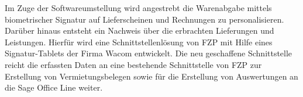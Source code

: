 Im Zuge der Softwareumstellung wird angestrebt die Warenabgabe mittels biometrischer Signatur auf Lieferscheinen und Rechnungen zu personalisieren. Darüber hinaus entsteht ein Nachweis über die erbrachten Lieferungen und Leistungen. Hierfür wird eine Schnittstellenlösung von FZP mit Hilfe eines Signatur-Tablets der Firma Wacom entwickelt. Die neu geschaffene Schnittstelle reicht die erfassten Daten an eine bestehende Schnittstelle von FZP zur Erstellung von Vermietungsbelegen sowie für die Erstellung von Auswertungen an die Sage Office Line weiter. \cite{einleitung1}